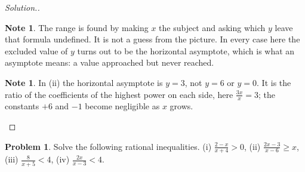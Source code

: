 \documentclass[11pt,a4paper]{article}
\theoremstyle{definition}
\newtheorem{note}[thm]{Note}
\newtheorem{problemx}{Problem}[section]
\newenvironment{problem}{\begin{problemx}}{\end{problemx}}
\newenvironment{solution}
  {\renewcommand{\qedsymbol}{}\begin{proof}[\textit{Solution}.]}
  {\end{proof}}
\begin{document}
\begin{solution}
\begin{note}
The range is found by making $x$ the subject and asking which $y$ leave that formula
undefined. It is not a guess from the picture. In every case here the excluded value of
$y$ turns out to be the horizontal asymptote, which is what an asymptote means: a value
approached but never reached.
\end{note}

\begin{note}
In (ii) the horizontal asymptote is $y=3$, not $y=6$ or $y=0$. It is the ratio of the
coefficients of the highest power on each side, here $\frac{3x}{x}=3$; the constants
$+6$ and $-1$ become negligible as $x$ grows.
\end{note}
\end{solution}

\begin{problem}
Solve the following rational inequalities.
\quad (i) $\frac{2-x}{x+4}>0$, \quad (ii) $\frac{2x-3}{x-6}\geq x$, \quad
(iii) $\frac{8}{x+5}<4$, \quad (iv) $\frac{2x}{x-3}<4$.
\end{problem}
\end{document}
